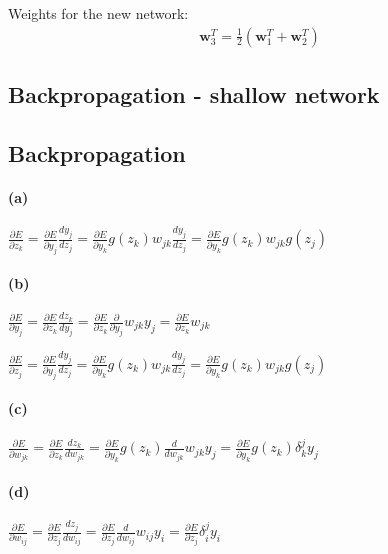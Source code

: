 \documentclass[a4paper,11pt]{article}
\begin{document}
	\noindent Weights for the new network:
	\begin{align*}
		\bm{w}_3^T=\frac{1}{2}(\bm{w}_1^T+\bm{w}_2^T)
	\end{align*}

	\subsection{Backpropagation - shallow network}

	\subsection{Backpropagation}
	\paragraph{(a)}
	$\frac{\partial E}{\partial z_k} =\frac{\partial E}{\partial y_j} \frac{dy_j}{dz_j} = \frac{\partial E}{\partial y_k} g(z_k) w_{jk} \frac{dy_j}{dz_j} = \frac{\partial E}{\partial y_k} g(z_k) w_{jk} g(z_j)$
	\paragraph{(b)}
	$\frac{\partial E}{\partial y_j} =\frac{\partial E}{\partial z_k} \frac{dz_k}{dy_j} =
	\frac{\partial E}{\partial z_k} \frac{\partial}{\partial y_j} w_{jk} y_j =\frac{\partial E}{\partial z_k} w_{jk}$\par
	\setlength\parindent{1cm} $\frac{\partial E}{\partial z_j} = \frac{\partial E}{\partial y_j} \frac{dy_j}{dz_j} = \frac{\partial E}{\partial y_k} g(z_k) w_{jk} \frac{dy_j}{dz_j} = \frac{\partial E}{\partial y_k} g(z_k) w_{jk} g(z_j)$
	\paragraph{(c)}
	$\frac{\partial E}{\partial w_{jk}} = \frac{\partial E}{\partial z_k} \frac{dz_k}{dw_{jk}} = \frac{\partial E}{\partial y_k} g(z_k) \frac{d}{dw_{jk}} w_{jk}y_{j} = \frac{\partial E}{\partial y_k} g(z_k) \delta^j_k y_j$
	\paragraph{(d)}
	$\frac{\partial E}{\partial w_{ij}} = \frac{\partial E}{\partial z_j} \frac{dz_j}{dw_{ij}} = \frac{\partial E}{\partial z_j} \frac{d}{dw_{ij}} w_{ij}y_i = \frac{\partial E}{\partial z_j} \delta^j_i y_i$\\
\end{document}
